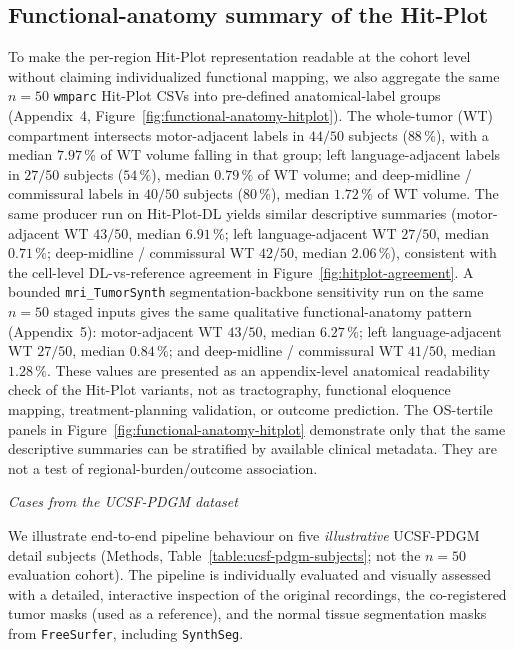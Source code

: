 \documentclass[a4paper,11pt,leqno]{article}
\begin{document}
\vspace{2mm}

\subsection*{Functional-anatomy summary of the Hit-Plot}

To make the per-region Hit-Plot representation readable at the
cohort level without claiming individualized functional mapping, we
also aggregate the same $n=50$ \texttt{wmparc} Hit-Plot CSVs into
pre-defined anatomical-label groups (Appendix~4,
Figure~\ref{fig:functional-anatomy-hitplot}). The whole-tumor (WT)
compartment intersects motor-adjacent labels in $44/50$ subjects
($88\,\%$), with a median $7.97\,\%$ of WT volume falling in that
group; left language-adjacent labels in $27/50$ subjects ($54\,\%$),
median $0.79\,\%$ of WT volume; and deep-midline / commissural labels
in $40/50$ subjects ($80\,\%$), median $1.72\,\%$ of WT volume. The
same producer run on Hit-Plot-DL yields similar descriptive summaries
(motor-adjacent WT $43/50$, median $6.91\,\%$; left
language-adjacent WT $27/50$, median $0.71\,\%$; deep-midline /
commissural WT $42/50$, median $2.06\,\%$), consistent with the
cell-level DL-vs-reference agreement in
Figure~\ref{fig:hitplot-agreement}. A bounded \texttt{mri\_TumorSynth}
segmentation-backbone sensitivity run on the same $n=50$ staged
inputs gives the same qualitative functional-anatomy pattern
(Appendix~5): motor-adjacent WT $43/50$, median $6.27\,\%$; left
language-adjacent WT $27/50$, median $0.84\,\%$; and deep-midline /
commissural WT $41/50$, median $1.28\,\%$. These values are presented as an
appendix-level anatomical readability check of the Hit-Plot variants,
not as tractography, functional eloquence mapping, treatment-planning
validation, or outcome prediction. The OS-tertile panels in
Figure~\ref{fig:functional-anatomy-hitplot} demonstrate only that the
same descriptive summaries can be stratified by available clinical metadata. They are not a test of regional-burden/outcome association.

\vspace{2mm}

\noindent \emph{Cases from the UCSF-PDGM dataset}

\vspace{2mm}

We illustrate end-to-end pipeline behaviour on five \emph{illustrative}
UCSF-PDGM detail subjects (Methods, Table~\ref{table:ucsf-pdgm-subjects};
not the $n=50$ evaluation cohort). The pipeline is individually evaluated
and visually assessed with a detailed, interactive inspection of the
original recordings, the co-registered tumor masks (used as a reference),
and the normal tissue segmentation masks from \texttt{FreeSurfer},
including \texttt{SynthSeg}.
\end{document}
